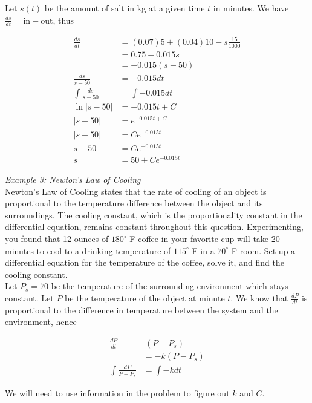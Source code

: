         Let $s(t)$ be the amount of salt in kg at a given time $t$ in minutes. We have $\frac{ds}{dt}=\text{in}-\text{out}$, thus

        \begin{align*}
                \frac{ds}{dt}   &= (0.07)5 + (0.04)10 - s\frac{15}{1000} \\
                                &= 0.75 - 0.015s \\
                                &= -0.015(s-50) \\
                \frac{ds}{s-50} &= -0.015 dt \\
                \int \frac{ds}{s-50}    &= \int -0.015 dt \\
                \ln{|s-50|}             &= -0.015t + C \\
                |s-50|                  &= e^{-0.015t+C} \\
                |s-50|                  &= Ce^{-0.015t} \\
                s-50                    &= Ce^{-0.015t} \\
                s                       &= 50 + Ce^{-0.015t}
        \end{align*}

        \textit{Example 3: Newton's Law of Cooling} \\
        Newton's Law of Cooling states that the rate of cooling of an object is proportional to the temperature difference between the object and its surroundings. The cooling constant, which is the
        proportionality constant in the differential equation, remains constant throughout this question. Experimenting, you found that 12 ounces of $180^{\circ}$ F coffee in your favorite cup will take 20 minutes to
        cool to a drinking temperature of $115^{\circ}$ F in a $70^{\circ}$ F room. Set up a differential equation for the temperature of the coffee, solve it, and find the cooling constant. \\

        Let $P_s=70$ be the temperature of the surrounding environment which stays constant. Let $P$ be the temperature of the object at minute $t$. We know that $\frac{dP}{dt}$ is proportional to the difference in
        temperature between the system and the environment, hence

        \begin{align*}
                \frac{dP}{dt}   &~ (P-P_s) \\
                                &= -k(P-P_s) \\
                \int \frac{dP}{P-P_s}   &= \int -k dt
        \end{align*}

        We will need to use information in the problem to figure out $k$ and $C$.

